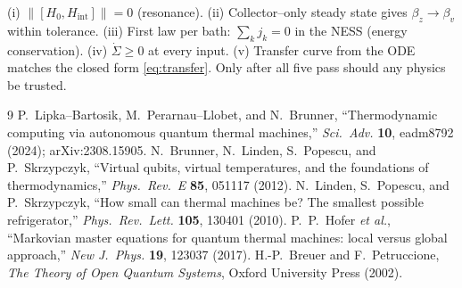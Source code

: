 \documentclass[11pt,a4paper]{article}
\theoremstyle{definition}
\theoremstyle{remark}
\begin{document}
\begin{implbox}
(i) $\|[H_0,H_{\mathrm{int}}]\|=0$ (resonance). (ii) Collector--only
steady state gives $\beta_z\to\beta_v$ within tolerance. (iii) First law
per bath: $\sum_k j_k=0$ in the NESS (energy conservation). (iv)
$\dot\Sigma\ge0$ at every input. (v) Transfer curve from the ODE matches
the closed form \eqref{eq:transfer}. Only after all five pass should any
physics be trusted.
\end{implbox}

\begin{thebibliography}{9}
P.~Lipka--Bartosik, M.~Perarnau--Llobet, and N.~Brunner,
``Thermodynamic computing via autonomous quantum thermal machines,''
\emph{Sci.\ Adv.} \textbf{10}, eadm8792 (2024); arXiv:2308.15905.
N.~Brunner, N.~Linden, S.~Popescu, and P.~Skrzypczyk,
``Virtual qubits, virtual temperatures, and the foundations of
thermodynamics,'' \emph{Phys.\ Rev.\ E} \textbf{85}, 051117 (2012).
N.~Linden, S.~Popescu, and P.~Skrzypczyk,
``How small can thermal machines be? The smallest possible
refrigerator,'' \emph{Phys.\ Rev.\ Lett.} \textbf{105}, 130401 (2010).
P.~P.~Hofer \emph{et al.},
``Markovian master equations for quantum thermal machines: local versus
global approach,'' \emph{New J.\ Phys.} \textbf{19}, 123037 (2017).
H.-P.~Breuer and F.~Petruccione,
\emph{The Theory of Open Quantum Systems}, Oxford University Press
(2002).
\end{thebibliography}
\end{document}
